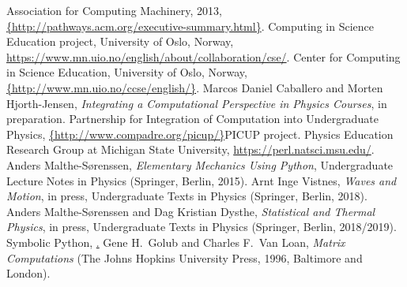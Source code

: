 \documentclass[graybox,envcountchap,sectrefs]{svmult}
\begin{document}
\begin{thebibliography}{99}
 Association for Computing Machinery, 2013, \url{{http://pathways.acm.org/executive-summary.html}}.
 Computing in Science Education project, University of Oslo, Norway, \url{https://www.mn.uio.no/english/about/collaboration/cse/}.
Center for Computing in Science Education, University of Oslo, Norway,  \url{{http://www.mn.uio.no/ccse/english/}}.
 Marcos Daniel Caballero and Morten Hjorth-Jensen, {\em Integrating a Computational Perspective in Physics Courses}, in preparation.
 Partnership for Integration of Computation into Undergraduate Physics, \url{{http://www.compadre.org/picup/}}{PICUP project}.
 Physics Education Research Group at Michigan State University, \url{https://perl.natsci.msu.edu/}.
Anders Malthe-S{\o}renssen, {\em Elementary Mechanics Using Python},
Undergraduate Lecture Notes in Physics (Springer, Berlin, 2015).
 Arnt Inge Vistnes, {\em Waves and Motion}, in press, Undergraduate Texts in Physics (Springer, Berlin, 2018).
 Anders Malthe-S{\o}renssen and Dag Kristian Dysthe, {\em Statistical and Thermal Physics}, in press,  Undergraduate Texts in Physics (Springer, Berlin, 2018/2019).
 Symbolic Python, \href{http://www.sympy.org/en/index.html}.
 Gene H.~Golub and Charles F.~Van Loan, {\em Matrix Computations} (The Johns Hopkins University Press, 1996, Baltimore and London).
\end{thebibliography}


\end{document}
